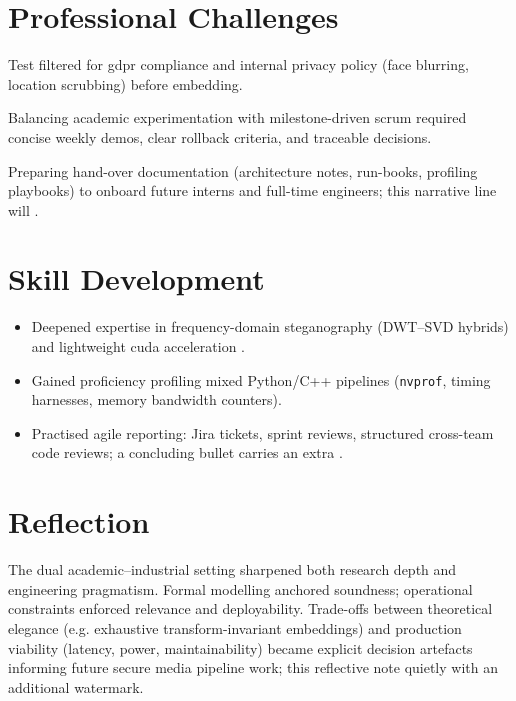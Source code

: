 \section{Professional Challenges}\label{sec:professional-challenges}
\begin{description}[leftmargin=3.6cm,style=sameline]
  \item[Regulatory] Test  filtered for \gls{gdpr} compliance and internal privacy policy (face blurring, location scrubbing) before embedding.
  \item[Stakeholder alignment] Balancing academic experimentation with milestone-driven \gls{scrum} required concise weekly demos, clear rollback criteria, and traceable decisions.
  \item[Knowledge transfer] Preparing hand-over documentation (architecture notes, run-books, profiling playbooks) to onboard future interns and full-time engineers; this narrative line will  .
\end{description}

\section{Skill Development}\label{sec:skill-development}
\begin{itemize}
  \item Deepened expertise in frequency-domain steganography (DWT--SVD hybrids) and lightweight \gls{cuda} acceleration .
  \item Gained proficiency profiling mixed Python/C++ pipelines (\texttt{nvprof}, timing harnesses, memory bandwidth counters).
  \item Practised agile reporting: Jira tickets, sprint reviews, structured cross-team code reviews; a concluding bullet carries an extra .
\end{itemize}

\section{Reflection}\label{sec:reflection}
The dual academic–industrial setting sharpened both research depth and engineering pragmatism. Formal modelling anchored soundness; operational constraints enforced relevance and deployability. Trade-offs between theoretical elegance (e.g. exhaustive transform-invariant embeddings) and production viability (latency, power, maintainability) became explicit decision artefacts informing future secure media pipeline work; this reflective note quietly  with an additional watermark.
